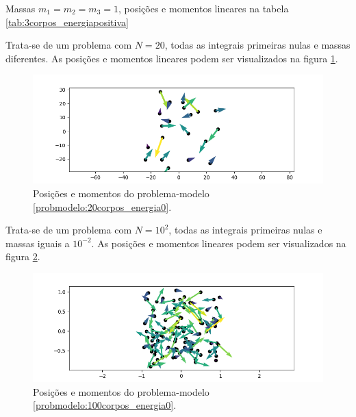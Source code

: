\begin{probmodelo}\label{probmodelo:3corpos_energia_positiva}
    Massas $m_1 = m_2 = m_3 = 1$, posições e momentos lineares na tabela \ref{tab:3corpos_energiapositiva}
    
\end{probmodelo}

\begin{probmodelo}[20 corpos]\label{probmodelo:20corpos_energia0}
    Trata-se de um problema com $N=20$, todas as integrais primeiras nulas e massas diferentes. As posições e momentos lineares podem ser visualizados na figura \ref{fig:probmodelo_20corpos}.
    \begin{figure}[H]
        \centering
        \includegraphics[width=0.5\linewidth]{tcc//img/20corpos_E_nula.png}
        \caption{Posições e momentos do problema-modelo \ref{probmodelo:20corpos_energia0}.}
        \label{fig:probmodelo_20corpos}
    \end{figure}
\end{probmodelo}

\begin{probmodelo}[100 corpos]\label{probmodelo:100corpos_energia0}
    Trata-se de um problema com $N=10^2$, todas as integrais primeiras nulas e massas iguais a $10^{-2}$. As posições e momentos lineares podem ser visualizados na figura \ref{fig:probmodelo_100corpos}.
    \begin{figure}[H]
        \centering
        \includegraphics[width=0.5\linewidth]{tcc//img/100corpos_E_nula.png}
        \caption{Posições e momentos do problema-modelo \ref{probmodelo:100corpos_energia0}.}
        \label{fig:probmodelo_100corpos}
    \end{figure}
\end{probmodelo}

